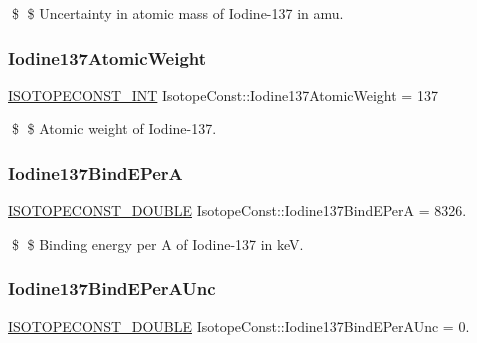 \$ \$ Uncertainty in atomic mass of Iodine-\/137 in amu. \mbox{\label{group___isotope_const-_iodine-_i137_gab9cda7233e32a96f05a98c6e665325cf}} 
\subsubsection{\texorpdfstring{Iodine137\+Atomic\+Weight}{Iodine137AtomicWeight}}
{\footnotesize\ttfamily \mbox{\hyperlink{group___isotope_const-_macros_ga5f18360b3e99483a35c32d789e62621c}{I\+S\+O\+T\+O\+P\+E\+C\+O\+N\+S\+T\+\_\+\+I\+NT}} Isotope\+Const\+::\+Iodine137\+Atomic\+Weight = 137}

\$ \$ Atomic weight of Iodine-\/137. \mbox{\label{group___isotope_const-_iodine-_i137_ga6ad29848c1ad0d6d7864dcc76e091cf2}} 
\subsubsection{\texorpdfstring{Iodine137\+Bind\+E\+PerA}{Iodine137BindEPerA}}
{\footnotesize\ttfamily \mbox{\hyperlink{group___isotope_const-_macros_ga8f45a7272ce02c0b4c65c44636ed719a}{I\+S\+O\+T\+O\+P\+E\+C\+O\+N\+S\+T\+\_\+\+D\+O\+U\+B\+LE}} Isotope\+Const\+::\+Iodine137\+Bind\+E\+PerA = 8326.}

\$ \$ Binding energy per A of Iodine-\/137 in keV. \mbox{\label{group___isotope_const-_iodine-_i137_gae96985474a89b35c42bded7ed9322cec}} 
\subsubsection{\texorpdfstring{Iodine137\+Bind\+E\+Per\+A\+Unc}{Iodine137BindEPerAUnc}}
{\footnotesize\ttfamily \mbox{\hyperlink{group___isotope_const-_macros_ga8f45a7272ce02c0b4c65c44636ed719a}{I\+S\+O\+T\+O\+P\+E\+C\+O\+N\+S\+T\+\_\+\+D\+O\+U\+B\+LE}} Isotope\+Const\+::\+Iodine137\+Bind\+E\+Per\+A\+Unc = 0.}

